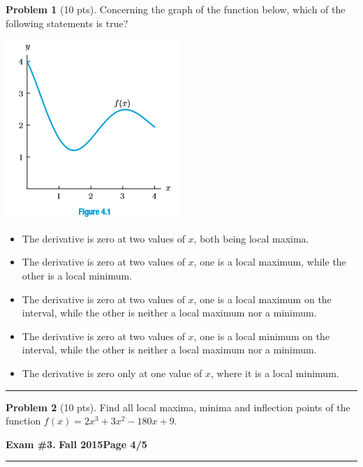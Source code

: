 \documentclass[12pt]{article}
\makeatletter
\theoremstyle{definition}
\newtheorem{problem}{Problem}
\newcommand*{\radiobutton}{%
  \@ifstar{\@radiobutton0}{\@radiobutton1}%
}
\newcommand*{\@radiobutton}[1]{%
  \begin{tikzpicture}
    \pgfmathsetlengthmacro\radius{height("X")/2}
    \draw[radius=\radius] circle;
    \ifcase#1 \fill[radius=.6*\radius] circle;\fi
  \end{tikzpicture}%
}
\makeatother
\begin{document}
\bigskip
\begin{problem}[10 pts]
Concerning the graph of the function below, which of the following statements is true?
\begin{center}
\includegraphics{graph3}
\end{center}
\begin{itemize}
\item[\radiobutton] The derivative is zero at two values of $x$, both being local maxima.
\item[\radiobutton] The derivative is zero at two values of $x$, one is a local maximum, while the other is a local minimum.
\item[\radiobutton] The derivative is zero at two values of $x$, one is a local maximum on the interval, while the other is neither a local maximum nor a minimum.
\item[\radiobutton] The derivative is zero at two values of $x$, one is a local minimum on the interval, while the other is neither a local maximum nor a minimum.
\item[\radiobutton] The derivative is zero only at one value of $x$, where it is a local minimum.
\end{itemize}
\end{problem}

\hrule
\begin{problem}[10 pts]
Find all local maxima, minima and inflection points of the function $f(x) = 2x^3 + 3x^2-180x+9$.
\end{problem}

\newpage

\hfill{\large\bf Exam \#3.}\hfill{\large\bf
  Fall 2015}\hfill{\large\bf Page 4/5}\hrule

\bigskip
\end{document}
